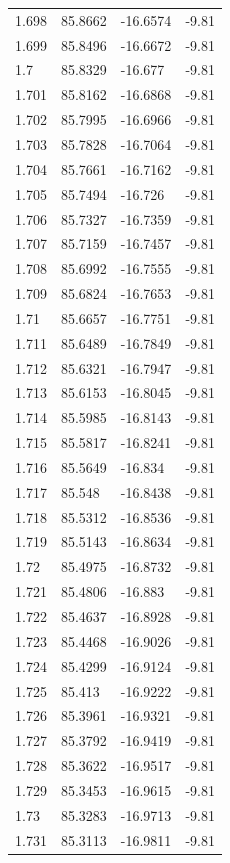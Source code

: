\begin{tabular}{llll}
1.698 & 85.8662 & -16.6574 & -9.81 \\
1.699 & 85.8496 & -16.6672 & -9.81 \\
1.7 & 85.8329 & -16.677 & -9.81 \\
1.701 & 85.8162 & -16.6868 & -9.81 \\
1.702 & 85.7995 & -16.6966 & -9.81 \\
1.703 & 85.7828 & -16.7064 & -9.81 \\
1.704 & 85.7661 & -16.7162 & -9.81 \\
1.705 & 85.7494 & -16.726 & -9.81 \\
1.706 & 85.7327 & -16.7359 & -9.81 \\
1.707 & 85.7159 & -16.7457 & -9.81 \\
1.708 & 85.6992 & -16.7555 & -9.81 \\
1.709 & 85.6824 & -16.7653 & -9.81 \\
1.71 & 85.6657 & -16.7751 & -9.81 \\
1.711 & 85.6489 & -16.7849 & -9.81 \\
1.712 & 85.6321 & -16.7947 & -9.81 \\
1.713 & 85.6153 & -16.8045 & -9.81 \\
1.714 & 85.5985 & -16.8143 & -9.81 \\
1.715 & 85.5817 & -16.8241 & -9.81 \\
1.716 & 85.5649 & -16.834 & -9.81 \\
1.717 & 85.548 & -16.8438 & -9.81 \\
1.718 & 85.5312 & -16.8536 & -9.81 \\
1.719 & 85.5143 & -16.8634 & -9.81 \\
1.72 & 85.4975 & -16.8732 & -9.81 \\
1.721 & 85.4806 & -16.883 & -9.81 \\
1.722 & 85.4637 & -16.8928 & -9.81 \\
1.723 & 85.4468 & -16.9026 & -9.81 \\
1.724 & 85.4299 & -16.9124 & -9.81 \\
1.725 & 85.413 & -16.9222 & -9.81 \\
1.726 & 85.3961 & -16.9321 & -9.81 \\
1.727 & 85.3792 & -16.9419 & -9.81 \\
1.728 & 85.3622 & -16.9517 & -9.81 \\
1.729 & 85.3453 & -16.9615 & -9.81 \\
1.73 & 85.3283 & -16.9713 & -9.81 \\
1.731 & 85.3113 & -16.9811 & -9.81 \\

\end{tabular}
